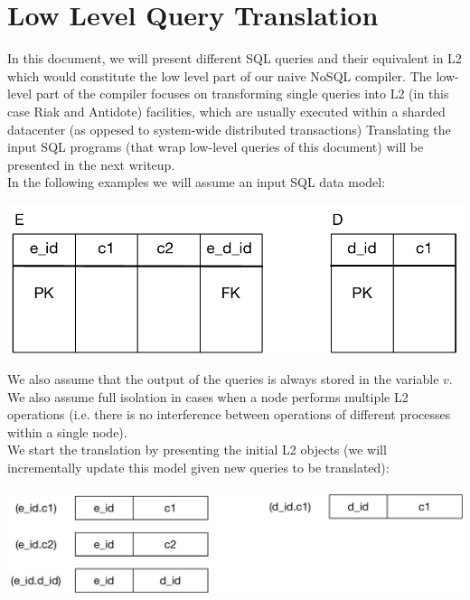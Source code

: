 \documentclass[12pt]{article}
\begin{document}


\section{Low Level Query Translation}
In this document, we will present different SQL queries and
their equivalent in L2 which would constitute the low level part of our naive
NoSQL compiler. 
The low-level part of the compiler focuses on transforming single queries into L2 (in this case
Riak and Antidote) facilities, which are usually executed within a sharded datacenter 
(as oppesed to system-wide distributed transactions)
Translating the input SQL programs (that wrap low-level queries of this
document) will be presented in the next writeup.
\\In the following examples we will assume an input SQL data model:\\
\begin{center}
\includegraphics[scale=0.55]{sql_base.pdf}
\end{center}
We also assume that the output of the queries is always
stored in the variable $v$. We also assume full isolation in cases when a node
performs
multiple L2 operations (i.e. there is no interference between operations
of different processes within a single node).
\\We start the translation by presenting the initial L2 objects (we will incrementally update this model
given new queries to be translated):\\ \\
\includegraphics[scale=0.55]{l2_base.pdf}
\end{document}
